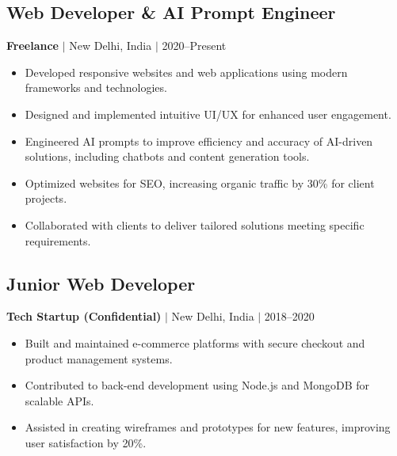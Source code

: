 \documentclass[a4paper,10pt]{article}
\begin{document}
\subsection*{Web Developer \& AI Prompt Engineer}
\textbf{Freelance} $|$ New Delhi, India $|$ 2020--Present
\begin{itemize}[leftmargin=*,itemsep=2pt]
    \item Developed responsive websites and web applications using modern frameworks and technologies.
    \item Designed and implemented intuitive UI/UX for enhanced user engagement.
    \item Engineered AI prompts to improve efficiency and accuracy of AI-driven solutions, including chatbots and content generation tools.
    \item Optimized websites for SEO, increasing organic traffic by 30\% for client projects.
    \item Collaborated with clients to deliver tailored solutions meeting specific requirements.
\end{itemize}

\subsection*{Junior Web Developer}
\textbf{Tech Startup (Confidential)} $|$ New Delhi, India $|$ 2018--2020
\begin{itemize}[leftmargin=*,itemsep=2pt]
    \item Built and maintained e-commerce platforms with secure checkout and product management systems.
    \item Contributed to back-end development using Node.js and MongoDB for scalable APIs.
    \item Assisted in creating wireframes and prototypes for new features, improving user satisfaction by 20\%.
\end{itemize}
\end{document}
